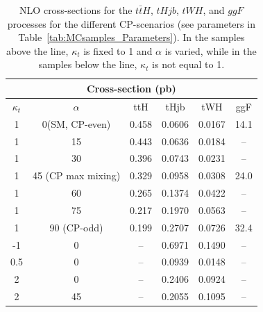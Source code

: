 \begin{table}[h!]
  \centering
  \begin{tabular}{|c|c||c|c|c|c|}
    \hline
    \multicolumn{6}{|c|}{Cross-section (pb)} \\
    \hline \hline
    $\kappa_t$ & $\alpha$ & ttH & tHjb & tWH & ggF\\
    \hline
    1 & 0(SM, CP-even) & 0.458 & 0.0606 & 0.0167 & 14.1\\
    1 & 15 & 0.443 & 0.0636 & 0.0184 & --\\
    1 & 30 & 0.396 & 0.0743 & 0.0231 & --\\
    1 & 45 (CP max mixing)& 0.329 & 0.0958 & 0.0308 & 24.0\\
    1 & 60 & 0.265 & 0.1374 & 0.0422 & --\\
    1 & 75 & 0.217 & 0.1970 & 0.0563 & --\\
    1 & 90 (CP-odd) & 0.199 & 0.2707 & 0.0726 & 32.4\\
    \hline \hline
    -1 & 0 & -- & 0.6971 & 0.1490 & -- \\
    0.5 & 0 & -- & 0.0939 & 0.0148 & -- \\
    2 & 0 & -- & 0.2406 & 0.0924 & -- \\
    2 & 45 & -- & 0.2055 & 0.1095 & -- \\
    \hline
  \end{tabular}
  \caption{NLO cross-sections for the $t\bar{t}H$, $tHjb$, $tWH$, and $ggF$ processes for the different CP-scenarios (see parameters in Table~\ref{tab:MCsamples_Parameters}). In the samples above the line, $\kappa_{t}$ is fixed to 1 and $\alpha$ is varied, while in the samples below the line, $\kappa_{t}$ is not equal to 1.}
  \label{tab:MCsamples_XS}
\end{table}

